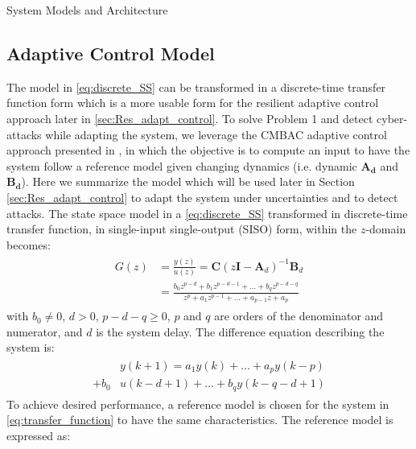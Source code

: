 \begin{section}{System Models and Architecture}
\subsection{Adaptive Control Model}
The model in \eqref{eq:discrete_SS} can be transformed in a discrete-time transfer function form which is a more usable form for the resilient adaptive control approach later in \ref{sec:Res_adapt_control}. To solve Problem 1 and detect cyber-attacks while adapting the system, we leverage the CMBAC adaptive control approach presented in \cite{4106038}, in which the objective is to compute an input to have the system follow a reference model given changing dynamics (i.e. dynamic $\bm{A_d}$ and  $\bm{B_d}$). Here we summarize the model which will be used later in Section \ref{sec:Res_adapt_control} to adapt the system under uncertainties and to detect attacks. The state space model in a \eqref{eq:discrete_SS} transformed in discrete-time transfer function, in single-input single-output (SISO) form, within the $z$-domain becomes:
	\begin{align}
	\begin{split}
	\label{eq:transfer_function}
        G(z) & = \frac{y(z)}{u(z)} = \bm{C}(z\bm{I}-\bm{A}_d)^{-1}\bm{B}_d  \\
	& = \frac{b_0z^{p-d}+b_1z^{p-d-1} +...+b_qz^{p-d-q}}{z^{p}+a_1z^{p-1}+...+a_{p-1}z+a_p} 
	\end{split}
	\end{align}
with $b_0\ne{0}$, $d>0$, $p-d-q\geq{0}$, $p$ and $q$ are orders of the denominator and numerator, and $d$ is the system delay. The difference equation describing the system is:
    \begin{align}
    \begin{split}
	\label{eq:difference_equation}
	&y(k+1)=a_1y(k)+\dots+a_py(k-p) \\
	+b_0&u(k-d+1)+\dots+b_qy(k-q-d+1)
	\end{split}
	\end{align}
To achieve desired performance, a reference model is chosen for the system in \eqref{eq:transfer_function} to have the same characteristics. The reference model is expressed as:



\end{section}
